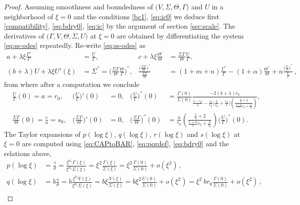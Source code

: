 \documentclass[11pt]{article}
\def\bg{{\bar{\gamma}}}
\def\bv{{\bar{v}}}
\def\bs{{\bar{\sigma}}}
\theoremstyle{remark}
\begin{document}
\begin{proof}
Assuming smoothness and boundedness of $\big(V, \Sigma, \Theta, \Gamma \big)$ and $U$ in a neighborhood of $\xi=0$ and the conditions \eqref{bc1}, \eqref{eq:ic0} we deduce first \eqref{compatibility}, \eqref{eq:bdry0}, \eqref{eq:ic} by the argument of
section \ref{sec:scale}. The derivatives of $\big(\Gamma,V,\Theta,\Sigma,U\big)$ at $\xi=0$ are obtained by differentiating the system \eqref{eq:ss-odes} repeatedly.
Re-write \eqref{eq:ss-odes} as
\begin{align*}
  a + \lambda\xi\frac{\Gamma'}{\Gamma} &= \frac{U}{\Gamma}, &
  c + \lambda\xi\frac{\Theta'}{\Theta} &= \frac{\Sigma\Gamma}{\Theta} \frac{U}{\Gamma},\\
  (b+\lambda)U  + \lambda \xi U'(\xi) &= \Sigma^{''} = \Big(\frac{\Sigma\Gamma}{\Theta} \frac{\Theta}{\Gamma}\Big)^{''}, &
  \frac{\Big(\frac{\Sigma\Gamma}{\Theta}\Big)^{''}}{\frac{\Sigma\Gamma}{\Theta}} &= (1+m+n)\frac{\Gamma^{''}}{\Gamma}-(1+\alpha) \frac{\Theta^{''}}{\Theta} + n \frac{ \big(\frac{U}{\Gamma}\big)^{''}}{\frac{U}{\Gamma}} \, ,
\end{align*}
from where after a computation we conclude
\begin{align*}
&\frac{U}{\Gamma}(0) = a = r_0,  & \Big(\frac{U}{\Gamma}\Big)'(0)&=0, & \Big(\frac{U}{\Gamma}\Big)^{''}(0) &= \frac{\Gamma(0)}{\Sigma(0)} \frac{-2(b+\lambda)r_0}{\frac{1-s_0}{\lambda}-\frac{n}{r_0}\Big(\frac{2}{s_0} + \frac{r_0}{\lambda}\Big)\left(\frac{ \frac{1}{\lambda}+2}{ \frac{1+\alpha}{\lambda}r_0 + \frac{2}{s_0}}\right)},\\
&\frac{\Sigma\Gamma}{\Theta}(0) = \frac{c}{a} = s_0,  & \Big(\frac{\Sigma\Gamma}{\Theta}\Big)'(0)&=0, &
\Big(\frac{\Sigma\Gamma}{\Theta}\Big)^{''}(0) &= \frac{n}{r_0} \left(\frac{ \frac{1}{\lambda}+2 }{ \frac{1+\alpha}{\lambda}r_0 + \frac{2}{s_0}}\right)\Big(\frac{U}{\Gamma}\Big)^{''}(0).
\end{align*}
The Taylor expansions of $p(\log\xi)$, $q(\log\xi)$, $r(\log\xi)$ and $s(\log\xi)$ at $\xi=0$ are computed using \eqref{eq:CAPtoBAR}, \eqref{eq:pqrdef}, \eqref{eq:bdry0}
and the relations above,
\begin{align*}
 p(\log\xi) &= \frac{ \bg }{\bs}  = \frac{ \xi^{a_1} \Gamma(\xi)}{\xi^{d_1} \Sigma(\xi)} = \xi^2\frac{\Gamma(\xi)}{\Sigma(\xi)} = \xi^2\frac{\Gamma(0)}{\Sigma(0)} + o(\xi^2) \, , \\
 q(\log\xi) &= b\frac{\bv}{\bs} = b\frac{ \xi^{b_1} V(\xi) }{ \xi^{d_1} \Sigma(\xi)} = b\xi\frac{ V(\xi) }{ \Sigma(\xi)} = b\xi^2 \frac{U(0)}{\Sigma(0)}+ o(\xi^2)=\xi^2 ~br_0\frac{\Gamma(0)}{\Sigma(0)} + o(\xi^2) \, ,\\

\end{align*}
\end{proof}
\end{document}
